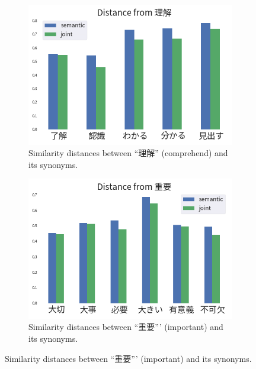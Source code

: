 \begin{CJK}{UTF8}{ipxm}
    \begin{figure}[h]
        \centering
        \begin{subfigure}[b]{0.45\textwidth}
            \centering
            \includegraphics[width=\textwidth]{../images/similarity_ja1.png}
            \caption{Similarity distances between ``理解'' (comprehend) and its synonyms.}
            \label{fig:similarity_ja1}
        \end{subfigure}
        \hspace{2em}
        \begin{subfigure}[b]{0.45\textwidth}
            \centering
            \includegraphics[width=\textwidth]{../images/similarity_ja2.png}
            \caption{Similarity distances between ``重要''' (important) and its synonyms.}
            \label{fig:similarity_ja2}
        \end{subfigure}
        

\end{figure}
\end{CJK}
